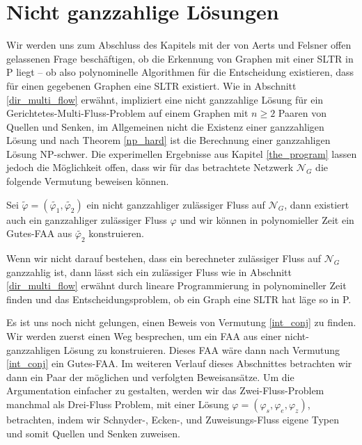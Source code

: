 \section{Nicht ganzzahlige Lösungen}

Wir werden uns zum Abschluss des Kapitels mit der von Aerts und Felsner offen gelassenen Frage beschäftigen, ob die Erkennung von Graphen mit einer SLTR in P liegt -- ob also polynominelle Algorithmen für die Entscheidung existieren, dass für einen gegebenen Graphen eine SLTR existiert. Wie in Abschnitt \ref{dir_multi_flow} erwähnt, impliziert eine nicht ganzzahlige Lösung für ein Gerichtetes-Multi-Fluss-Problem auf einem Graphen mit $n\geq 2$ Paaren von Quellen und Senken, im Allgemeinen nicht die Existenz einer ganzzahligen Lösung und nach Theorem \ref{np_hard} ist die Berechnung einer ganzzahligen Lösung NP-schwer. Die experimellen Ergebnisse aus Kapitel \ref{the_program} lassen jedoch die Möglichkeit offen, dass wir für das betrachtete Netzwerk $\mathcal{N}_G$ die folgende Vermutung beweisen können.

\begin{conjecture}\label{int_conj}
Sei $\tilde{\varphi}=(\tilde{\varphi_1},\tilde{\varphi_2})$ ein nicht ganzzahliger zulässiger Fluss auf $\mathcal{N}_G$, dann existiert auch ein ganzzahliger zulässiger Fluss $\varphi$ und wir können in polynomieller Zeit ein Gutes-FAA aus $\tilde{\varphi_2}$ konstruieren.
\end{conjecture}

\begin{remark}
Wenn wir nicht darauf bestehen, dass ein berechneter zulässiger Fluss auf $\mathcal{N}_G$ ganzzahlig ist, dann lässt sich ein zulässiger Fluss wie in Abschnitt \ref{dir_multi_flow} erwähnt durch lineare Programmierung in polynomineller Zeit finden und das Entscheidungsproblem, ob ein Graph eine SLTR hat läge so in P.
\end{remark}

Es ist uns noch nicht gelungen, einen Beweis von Vermutung \ref{int_conj} zu finden. Wir werden zuerst einen Weg besprechen, um ein FAA aus einer nicht-ganzzahligen Lösung zu konstruieren. Dieses FAA wäre dann nach Vermutung \ref{int_conj} ein Gutes-FAA. Im weiteren Verlauf dieses Abschnittes betrachten wir dann ein Paar der möglichen und verfolgten Beweisansätze. Um die Argumentation einfacher zu gestalten, werden wir das Zwei-Fluss-Problem manchmal als Drei-Fluss Problem, mit einer Lösung $\varphi=(\varphi_s,\varphi_e,\varphi_z)$, betrachten, indem wir Schnyder-, Ecken-, und Zuweisungs-Fluss eigene Typen und somit Quellen und Senken zuweisen.

